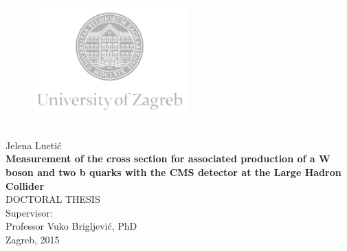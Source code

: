 \documentclass[12pt, twoside]{Thesis}
\begin{document}
\begin{titlepage}
  \fontsize{16pt}{20pt}\selectfont
  \selectfont
  \setlength{\intextsep}{0pt plus 0pt minus 0pt}

  \begin{center}
    \begin{figure}[ht!]
      \begin{center}
        \includegraphics[height=4.1184cm, width=5.94cm]{logo_unizg_eng}
      \end{center}
    \end{figure}		
    \vspace{0cm}
    {} \\
    \vspace{1.8cm}
    Jelena Luetić \\
    \vspace{1.8cm}
    {\fontsize{22pt}{22pt}\selectfont\textbf{Measurement of the cross section for associated production of a W boson and two b quarks with the CMS detector at the Large Hadron Collider}} \\
    \vspace{2cm}   
    DOCTORAL THESIS \\  
    \vspace{2cm}   %
    Supervisor:\\Professor Vuko Brigljević, PhD \\
    \vfill{Zagreb, 2015}
  \end{center}
\end{titlepage}
\end{document}
